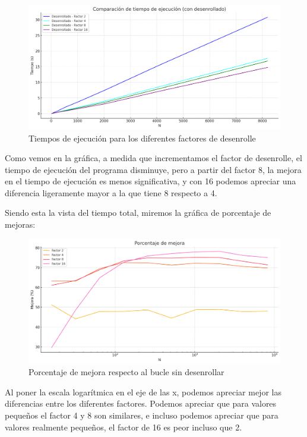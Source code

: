 \documentclass[a4paper,twocolumn]{article}
\begin{document}
\begin{figure}[H]
	\centering
	\includegraphics[width=\columnwidth]{img/comp.png}
	\caption{Tiempos de ejecución para los diferentes factores de desenrolle}
	\label{fig:times}
\end{figure}

Como vemos en la gráfica, a medida que incrementamos el factor de desenrolle, el tiempo de ejecución del programa disminuye, pero a partir del factor 8, la mejora en el tiempo de ejecución es menos significativa, y con 16 podemos apreciar una diferencia ligeramente mayor a la que tiene 8 respecto a 4. 

Siendo esta la vista del tiempo total, miremos la gráfica de porcentaje de mejoras:

\begin{figure}[H]
	\centering
	\includegraphics[width=\columnwidth]{img/porcentajeMejora.png}
	\caption{Porcentaje de mejora respecto al bucle sin desenrollar}
	\label{fig:times}
\end{figure}

Al poner la escala logarítmica en el eje de las x, podemos apreciar mejor las diferencias entre los diferentes factores. Podemos apreciar que para valores pequeños el factor 4 y 8 son similares, e incluso podemos apreciar que para valores realmente pequeños, el factor de 16 es peor incluso que 2.
\end{document}
